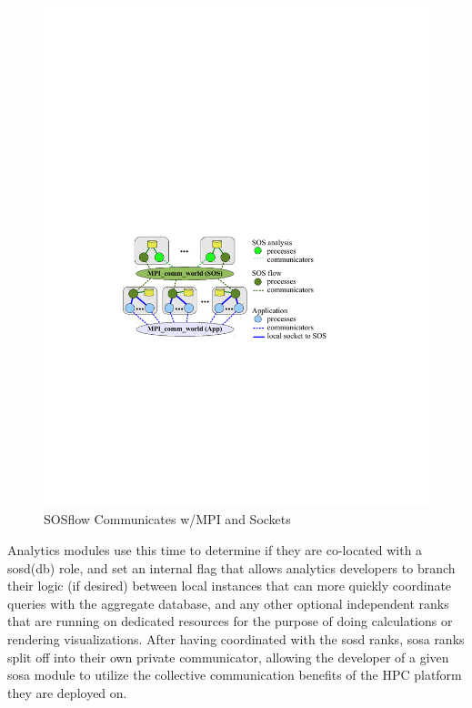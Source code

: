 \begin{figure}[!t]
  \centering
  \includegraphics[width=5in]{images/sos-mpmd.pdf}
  \caption{SOSflow Communicates w/MPI and Sockets}
  \label{fig_sim}
\end{figure}

Analytics modules use this time to determine if they are co-located
with a sosd(db) role, and set an internal flag that allows analytics
developers to branch their logic (if desired) between local instances that
can more quickly coordinate queries with the aggregate database, and any 
other optional independent ranks that are running on dedicated resources
for the purpose of doing calculations or rendering visualizations.
%
After having coordinated with the sosd ranks, sosa ranks split off
into their own private communicator, allowing the developer of a given
sosa module to utilize the collective communication benefits of the
HPC platform they are deployed on.


